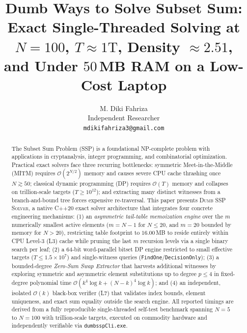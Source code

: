 \documentclass[journal,onecolumn,11pt]{IEEEtran}
\begin{document}
\title{Dumb Ways to Solve Subset Sum: Exact Single-Threaded Solving at $N = 100$, $T \approx 1\text{T}$, Density $\approx 2.51$, and Under $50$\,MB RAM on a Low-Cost Laptop}

\author{M. Diki Fahriza\\
Independent Researcher\\
\texttt{mdikifahriza3@gmail.com}}

\maketitle

\begin{abstract}
The Subset Sum Problem (SSP) is a foundational NP-complete problem with applications in cryptanalysis, integer programming, and combinatorial optimization. Practical exact solvers face three recurring bottlenecks: symmetric Meet-in-the-Middle (MITM) requires $\mathcal{O}(2^{N/2})$ memory and causes severe CPU cache thrashing once $N \gtrsim 50$; classical dynamic programming (DP) requires $\mathcal{O}(T)$ memory and collapses on trillion-scale targets ($T \ge 10^{12}$); and extracting many distinct witnesses from a branch-and-bound tree forces expensive re-traversal. This paper presents \textsc{Dumb SSP Solver}, a native C++20 exact solver architecture that integrates four concrete engineering mechanisms: (1) an \emph{asymmetric tail-table memoization engine} over the $m$ numerically smallest active elements ($m = N-1$ for $N \le 20$, and $m = 20$ bounded by memory for $N > 20$), restricting table footprint to $16.00$\,MB to reside entirely within CPU Level-3 (L3) cache while pruning the last $m$ recursion levels via a single binary search per leaf; (2) a $64$-bit word-parallel bitset DP engine restricted to small effective targets ($T \le 1.5\times10^{7}$) and single-witness queries (\texttt{FindOne}/\texttt{DecisionOnly}); (3) a bounded-degree \emph{Zero-Sum Swap Extractor} that harvests additional witnesses by exploring symmetric and asymmetric element substitutions up to degree $p \le 4$ in fixed-degree polynomial time $\mathcal{O}(k^4\log k + (N-k)^4\log k)$; and (4) an independent, isolated $\mathcal{O}(k)$ black-box verifier (L7) that validates index bounds, element uniqueness, and exact sum equality outside the search engine. All reported timings are derived from a fully reproducible single-threaded self-test benchmark spanning $N=5$ to $N=100$ with trillion-scale targets, executed on commodity hardware and independently verifiable via \texttt{dumbsspCli.exe}.
\end{abstract}
\end{document}
